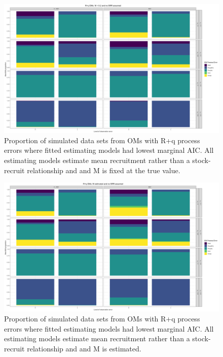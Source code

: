 \documentclass[
  12pt,
]{article}
\begin{document}
\begin{landscape}
\begin{figure}
\caption{Proportion of simulated data sets from OMs with R+q process errors where fitted estimating models had lowest marginal AIC. All estimating models estimate mean recruitment rather than a stock-recruit relationship and and M is fixed at the true value.} \label{q_om_proportion_best_aic_R_MF}
\begin{center}
\includegraphics[width = \textwidth]{q_om_proportion_best_aic_R_MF.png}
\end{center}
\end{figure}
\end{landscape}

\begin{landscape}
\begin{figure}
\caption{Proportion of simulated data sets from OMs with R+q process errors where fitted estimating models had lowest marginal AIC. All estimating models estimate mean recruitment rather than a stock-recruit relationship and and M is estimated.} \label{q_om_proportion_best_aic_R_ME}
\begin{center}
\includegraphics[width = \textwidth]{q_om_proportion_best_aic_R_ME.png}
\end{center}
\end{figure}
\end{landscape}
\end{document}
